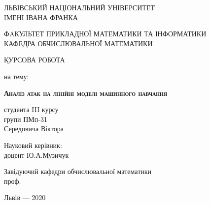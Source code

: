 \documentclass[a4paper,14pt]{extreport}
\begin{document}
    \begin{titlepage}%
       \begin{center}
       	{ЛЬВІВСЬКИЙ НАЦІОНАЛЬНИЙ УНІВЕРСИТЕТ \\ІМЕНІ ІВАНА ФРАНКА}\par
       	{ФAКУЛЬТЕТ ПРИКЛАДНОЇ МАТЕМАТИКИ ТА ІНФОРМАТИКИ\\ КАФЕДРА ОБЧИСЛЮВАЛЬНОЇ МАТЕМАТИКИ}\par
       	\begin{center}

       	\end{center}
       	\vspace{10mm}
       	\b{КУРСОВА РОБОТА}\par
       	{\small{на тему:}}\par
       	\vspace{20mm}
       	{\LARGE{\bf{\scshape{Аналіз атак на лінійні моделі машинного навчання}}}}\par
       	\vspace{5mm}
       	{}\par %
       \end{center}
   	   \vfill
   	   \hfill
   	   \begin{flushright}
   	   	\begin{minipage}[t]{80mm}
   	   		\flushright
   	   		студента III курсу\\
   	   		групи ПМп-31\\
   	   		{Середовича Віктора}\par
   	   		\vspace{2ex}
   	   		Науковий керівник:\\
   	   		{доцент Ю.А.Музичук}\\
   	   	\end{minipage}
   	   \end{flushright}
   	   \vspace{10mm}
   	   \begin{flushleft}
   	   	\begin{minipage}[t]{80mm}
   	   		\flushleft
   	   		Завідуючий кафедри обчислювальної математики\\
   	   		проф.  
   	   	\end{minipage}
   	   \end{flushleft}
   	   \vfill
   	   \vspace{10mm}
   	   \begin{center}Львів --- 2020\end{center}
    \end{titlepage}
\end{document}
